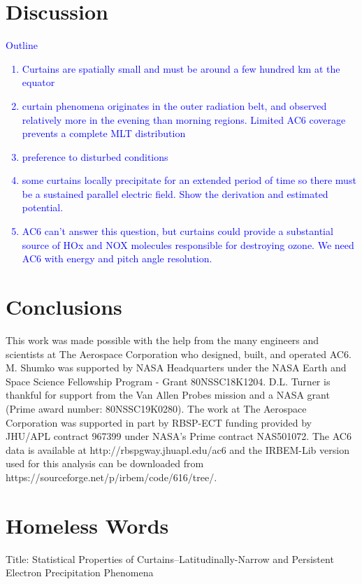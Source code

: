\documentclass[draft]{agujournal2019}
\begin{document}
\section{Discussion} \label{discussion}
\textcolor{blue}{
Outline
\begin{enumerate}
\item Curtains are spatially small and must be around a few hundred km at the equator
\item curtain phenomena originates in the outer radiation belt, and observed relatively more in the evening than morning regions. Limited AC6 coverage prevents a complete MLT distribution
\item preference to disturbed conditions
\item some curtains locally precipitate for an extended period of time so there must be a sustained parallel electric field. Show the derivation and estimated potential.
\item AC6 can't answer this question, but curtains could provide a substantial source of HOx and NOX molecules responsible for destroying ozone. We need AC6 with energy and pitch angle resolution.
\end{enumerate}}

\section{Conclusions}


\acknowledgments
This work was made possible with the help from the many engineers and scientists at The Aerospace Corporation who designed, built, and operated AC6. M. Shumko was supported by NASA Headquarters under the NASA Earth and Space Science Fellowship Program - Grant 80NSSC18K1204. D.L. Turner is thankful for support from the Van Allen Probes mission and a NASA grant (Prime award number: 80NSSC19K0280). The work at The Aerospace Corporation was supported in part by RBSP-ECT funding provided by JHU/APL contract 967399 under NASA's Prime contract NAS501072. The AC6 data is available at http://rbspgway.jhuapl.edu/ac6 and the IRBEM-Lib version used for this analysis can be downloaded from https://sourceforge.net/p/irbem/code/616/tree/.

\section{Homeless Words}

Title: Statistical Properties of Curtains--Latitudinally-Narrow and Persistent Electron Precipitation Phenomena
\end{document}
